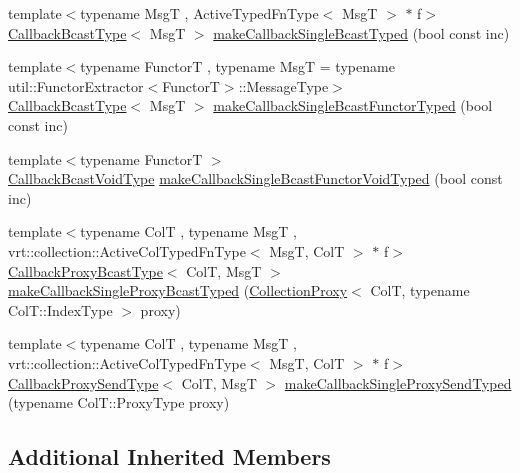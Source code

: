 \begin{DoxyCompactItemize}
\item 
{\footnotesize template$<$typename MsgT , Active\+Typed\+Fn\+Type$<$ Msg\+T $>$ $\ast$ f$>$ }\\\hyperlink{structvt_1_1pipe_1_1_pipe_manager_typed_a4176395e8a35ec2a809890a9aad5b29e}{Callback\+Bcast\+Type}$<$ MsgT $>$ \hyperlink{structvt_1_1pipe_1_1_pipe_manager_typed_a2ad082461a47d098fa5dadb7aca517e7}{make\+Callback\+Single\+Bcast\+Typed} (bool const inc)
\item 
{\footnotesize template$<$typename FunctorT , typename MsgT  = typename util\+::\+Functor\+Extractor$<$\+Functor\+T$>$\+::\+Message\+Type$>$ }\\\hyperlink{structvt_1_1pipe_1_1_pipe_manager_typed_a4176395e8a35ec2a809890a9aad5b29e}{Callback\+Bcast\+Type}$<$ MsgT $>$ \hyperlink{structvt_1_1pipe_1_1_pipe_manager_typed_a74135c6c11f5cd49bf560be506056a03}{make\+Callback\+Single\+Bcast\+Functor\+Typed} (bool const inc)
\item 
{\footnotesize template$<$typename FunctorT $>$ }\\\hyperlink{structvt_1_1pipe_1_1_pipe_manager_typed_ab028a342e37daeacc38acbfc185e0997}{Callback\+Bcast\+Void\+Type} \hyperlink{structvt_1_1pipe_1_1_pipe_manager_typed_a9392cfaa2787f28fd1193421eff4e837}{make\+Callback\+Single\+Bcast\+Functor\+Void\+Typed} (bool const inc)
\item 
{\footnotesize template$<$typename ColT , typename MsgT , vrt\+::collection\+::\+Active\+Col\+Typed\+Fn\+Type$<$ Msg\+T, Col\+T $>$ $\ast$ f$>$ }\\\hyperlink{structvt_1_1pipe_1_1_pipe_manager_typed_a74e5f1a359ab32259f855998f867d93a}{Callback\+Proxy\+Bcast\+Type}$<$ ColT, MsgT $>$ \hyperlink{structvt_1_1pipe_1_1_pipe_manager_typed_a4709469e02dda4bbe02cf5f5e18e36d6}{make\+Callback\+Single\+Proxy\+Bcast\+Typed} (\hyperlink{namespacevt_a0d58a693bfb96e0ce5d145692a1a1f98}{Collection\+Proxy}$<$ ColT, typename Col\+T\+::\+Index\+Type $>$ proxy)
\item 
{\footnotesize template$<$typename ColT , typename MsgT , vrt\+::collection\+::\+Active\+Col\+Typed\+Fn\+Type$<$ Msg\+T, Col\+T $>$ $\ast$ f$>$ }\\\hyperlink{structvt_1_1pipe_1_1_pipe_manager_typed_a9259903ba569c54c4e4bc6ad7888e059}{Callback\+Proxy\+Send\+Type}$<$ ColT, MsgT $>$ \hyperlink{structvt_1_1pipe_1_1_pipe_manager_typed_abc80f7c6999d009ddd2a531cc858698e}{make\+Callback\+Single\+Proxy\+Send\+Typed} (typename Col\+T\+::\+Proxy\+Type proxy)
\end{DoxyCompactItemize}
\subsection*{Additional Inherited Members}


